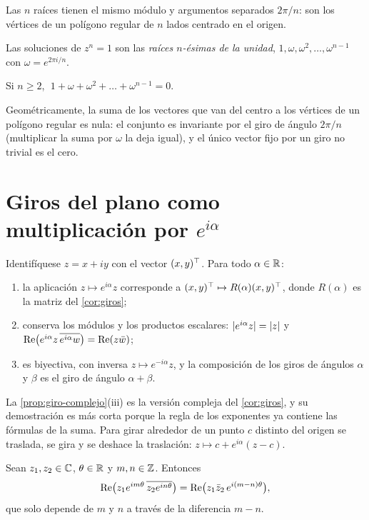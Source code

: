Las $n$ raíces tienen el mismo módulo y argumentos separados $2\pi/n$: son los vértices de un polígono regular de $n$ lados centrado en el origen.

\begin{definicion}
Las soluciones de $z^{n}=1$ son las \emph{raíces $n$-ésimas de la unidad}, $1,\omega,\omega^{2},\dots,\omega^{n-1}$ con $\omega=e^{2\pi i/n}$.
\end{definicion}

\begin{proposicion}\label{prop:suma-raices}
Si $n\ge2$, $\;1+\omega+\omega^{2}+\dots+\omega^{n-1}=0$.
\end{proposicion}

Geométricamente, la suma de los vectores que van del centro a los vértices de un polígono regular es nula: el conjunto es invariante por el giro de ángulo $2\pi/n$ (multiplicar la suma por $\omega$ la deja igual), y el único vector fijo por un giro no trivial es el cero.

\addtocounter{figure}{1}%

\section{Giros del plano como multiplicación por \texorpdfstring{$e^{i\alpha}$}{e\textasciicircum ia}}

\begin{proposicion}[Giros]\label{prop:giro-complejo}
Identifíquese $z=x+iy$ con el vector $(x,y)^{\top}$. Para todo $\alpha\in\mathbb{R}$:
\begin{enumerate}
  \item la aplicación $z\mapsto e^{i\alpha}z$ corresponde a $(x,y)^{\top}\mapsto R(\alpha)(x,y)^{\top}$, donde $R(\alpha)$ es la matriz del \cref{cor:giros};
  \item conserva los módulos y los productos escalares: $\lvert e^{i\alpha}z\rvert=\lvert z\rvert$ y $\operatorname{Re}\bigl(e^{i\alpha}z\,\overline{e^{i\alpha}w}\bigr)=\operatorname{Re}(z\bar w)$;
  \item es biyectiva, con inversa $z\mapsto e^{-i\alpha}z$, y la composición de los giros de ángulos $\alpha$ y $\beta$ es el giro de ángulo $\alpha+\beta$.
\end{enumerate}
\end{proposicion}

La \cref{prop:giro-complejo}(iii) es la versión compleja del \cref{cor:giros}, y su demostración es más corta porque la regla de los exponentes ya contiene las fórmulas de la suma. Para girar alrededor de un punto $c$ distinto del origen se traslada, se gira y se deshace la traslación: $z\mapsto c+e^{i\alpha}(z-c)$.

\begin{corolario}\label{cor:rope}
Sean $z_1,z_2\in\mathbb{C}$, $\theta\in\mathbb{R}$ y $m,n\in\mathbb{Z}$. Entonces
\[
\operatorname{Re}\bigl(z_1e^{im\theta}\,\overline{z_2e^{in\theta}}\bigr)=\operatorname{Re}\bigl(z_1\bar z_2\,e^{i(m-n)\theta}\bigr),
\]
que solo depende de $m$ y $n$ a través de la diferencia $m-n$.
\end{corolario}

\addtocounter{definicion}{1}%

\addtocounter{definicion}{1}%

